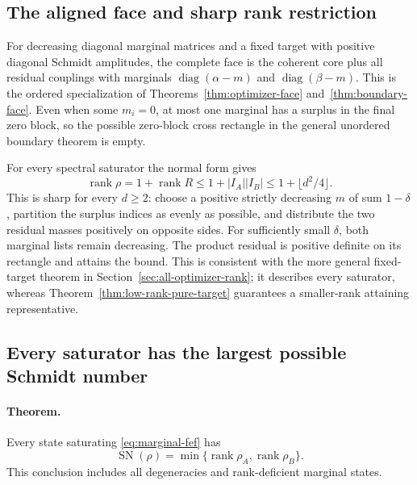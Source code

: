 \subsection{The aligned face and sharp rank restriction}
For decreasing diagonal marginal matrices and a fixed target with positive
diagonal Schmidt amplitudes, the complete face is the coherent core plus
all residual couplings with marginals $\operatorname{diag}(\alpha-m)$ and
$\operatorname{diag}(\beta-m)$. This is the ordered specialization of
Theorems~\ref{thm:optimizer-face} and~\ref{thm:boundary-face}. Even when
some $m_i=0$, at most one marginal has a surplus in the final zero block,
so the possible zero-block cross rectangle in the general unordered
boundary theorem is empty.

For every spectral saturator the normal form gives
\[
 \operatorname{rank}\rho=1+\operatorname{rank}R
 \le1+|I_A||I_B|\le1+\lfloor d^2/4\rfloor.
\]
This is sharp for every $d\ge2$: choose a positive strictly decreasing
$m$ of sum $1-\delta$, partition the surplus indices as evenly as possible,
and distribute the two residual masses positively on opposite sides.
For sufficiently small $\delta$, both marginal lists remain decreasing.
The product residual is positive definite on its rectangle and attains
the bound. This is consistent with the more general fixed-target theorem
in Section~\ref{sec:all-optimizer-rank}; it describes every saturator,
whereas Theorem~\ref{thm:low-rank-pure-target} guarantees a smaller-rank
attaining representative.

\subsection{Every saturator has the largest possible Schmidt number}

\paragraph{Theorem.}
Every state saturating \eqref{eq:marginal-fef} has
\[
 \operatorname{SN}(\rho)
       =\min\{\operatorname{rank}\rho_A,\operatorname{rank}\rho_B\}.
\]
This conclusion includes all degeneracies and rank-deficient marginal states.


